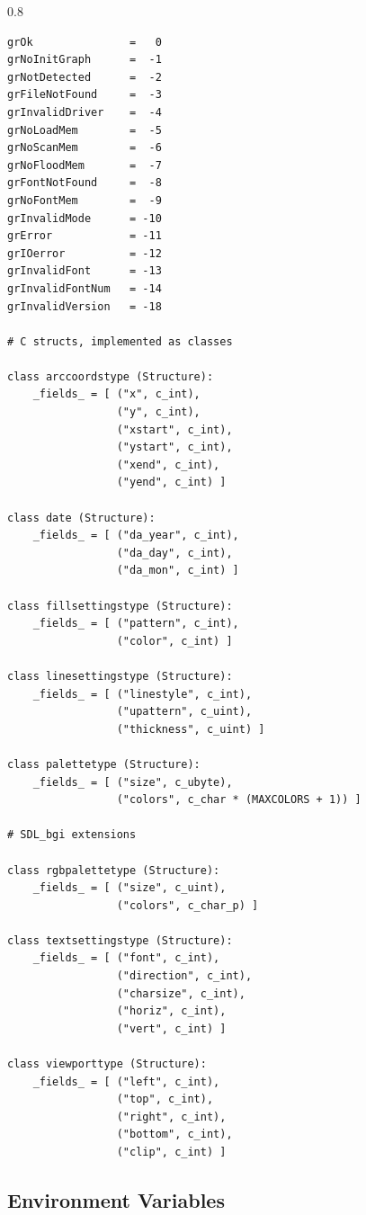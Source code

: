 \documentclass[a4paper,12pt]{article}
\newenvironment{margins}[2]
{ %
\begin{list}{}
{
\setlength{\leftmargin}{#1}
\setlength{\rightmargin}{#2}
} \item
} %
{\end{list}}
\begin{document}
\begin{margins}{-0.5cm}{-0.5cm}
\begin{spacing}{0.8}
\begin{lstlisting}
grOk               =   0
grNoInitGraph      =  -1
grNotDetected      =  -2
grFileNotFound     =  -3
grInvalidDriver    =  -4
grNoLoadMem        =  -5
grNoScanMem        =  -6
grNoFloodMem       =  -7
grFontNotFound     =  -8
grNoFontMem        =  -9
grInvalidMode      = -10
grError            = -11
grIOerror          = -12
grInvalidFont      = -13
grInvalidFontNum   = -14
grInvalidVersion   = -18

# C structs, implemented as classes

class arccoordstype (Structure):
    _fields_ = [ ("x", c_int),
                 ("y", c_int),
                 ("xstart", c_int),
                 ("ystart", c_int),
                 ("xend", c_int),
                 ("yend", c_int) ]

class date (Structure):
    _fields_ = [ ("da_year", c_int),
                 ("da_day", c_int),
                 ("da_mon", c_int) ]

class fillsettingstype (Structure):
    _fields_ = [ ("pattern", c_int),
                 ("color", c_int) ]

class linesettingstype (Structure):
    _fields_ = [ ("linestyle", c_int),
                 ("upattern", c_uint),
                 ("thickness", c_uint) ]

class palettetype (Structure):
    _fields_ = [ ("size", c_ubyte),
                 ("colors", c_char * (MAXCOLORS + 1)) ]

# SDL_bgi extensions

class rgbpalettetype (Structure):
    _fields_ = [ ("size", c_uint),
                 ("colors", c_char_p) ]

class textsettingstype (Structure):
    _fields_ = [ ("font", c_int),
                 ("direction", c_int),
                 ("charsize", c_int),
                 ("horiz", c_int),
                 ("vert", c_int) ]

class viewporttype (Structure):
    _fields_ = [ ("left", c_int),
                 ("top", c_int),
                 ("right", c_int),
                 ("bottom", c_int),
                 ("clip", c_int) ]
\end{lstlisting}
\end{spacing}

\end{margins}


\subsection{Environment Variables}
\end{document}
